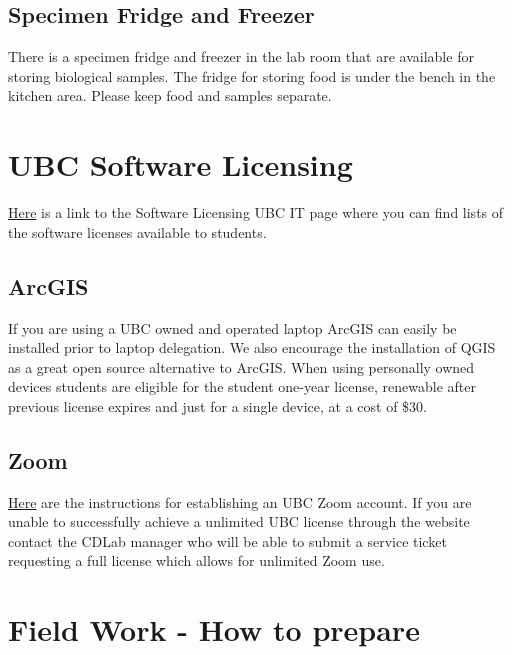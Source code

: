 \documentclass[
]{book}
\begin{document}
\hypertarget{specimen-fridge-and-freezer}{%
\section{Specimen Fridge and Freezer}\label{specimen-fridge-and-freezer}}

There is a specimen fridge and freezer in the lab room that are available for storing biological samples. The fridge for storing food is under the bench in the kitchen area. Please keep food and samples separate.

\hypertarget{softwarelicenses}{%
\chapter*{UBC Software Licensing}\label{softwarelicenses}}

\href{https://it.ubc.ca/services/desktop-support-services/software-licensing}{Here} is a link to the Software Licensing UBC IT page where you can find lists of the software licenses available to students.

\hypertarget{arcgis}{%
\section{ArcGIS}\label{arcgis}}

If you are using a UBC owned and operated laptop ArcGIS can easily be installed prior to laptop delegation. We also encourage the installation of QGIS as a great open source alternative to ArcGIS. When using personally owned devices students are eligible for the student one-year license, renewable after previous license expires and just for a single device, at a cost of \$30.

\hypertarget{zoom}{%
\section{Zoom}\label{zoom}}

\href{https://it.ubc.ca/services/teaching-learning-tools/zoom-video-conferencing}{Here} are the instructions for establishing an UBC Zoom account. If you are unable to successfully achieve a unlimited UBC license through the website contact the CDLab manager who will be able to submit a service ticket requesting a full license which allows for unlimited Zoom use.

\hypertarget{fieldworkprep}{%
\chapter*{Field Work - How to prepare}\label{fieldworkprep}}
\end{document}
